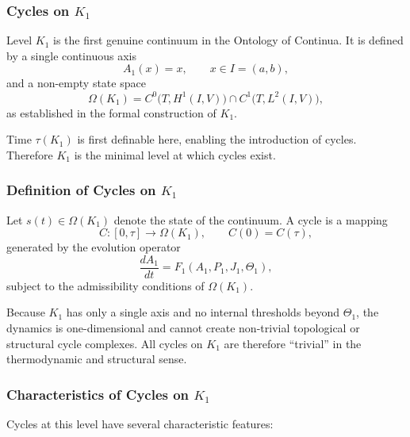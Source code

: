 
\subsubsection{Cycles on \texorpdfstring{$K_1$}{K_1}}
\label{sec:cycles-k1}

Level $K_1$ is the first genuine continuum in the Ontology of
Continua.  
It is defined by a single continuous axis
\[
  A_1(x)=x, \qquad x\in I=(a,b),
\]
and a non-empty state space
\[
  \Omega(K_1)
  = C^0\!\bigl(T, H^1(I,V)\bigr)
    \cap C^1\!\bigl(T, L^2(I,V)\bigr),
\]
as established in the formal construction of $K_1$.

Time $\tau(K_1)$ is first definable here, enabling the introduction of
cycles.  
Therefore $K_1$ is the minimal level at which cycles exist.

\subsubsection{Definition of Cycles on \texorpdfstring{$K_1$}{K_1}}

Let $s(t)\in\Omega(K_1)$ denote the state of the continuum.  
A cycle is a mapping
\[
  C:[0,\tau]\to\Omega(K_1), \qquad
  C(0)=C(\tau),
\]
generated by the evolution operator
\[
  \frac{dA_1}{dt} = F_1(A_1,P_1,J_1,\Theta_1),
\]
subject to the admissibility conditions of $\Omega(K_1)$.

Because $K_1$ has only a single axis and no internal thresholds beyond
$\Theta_1$, the dynamics is one-dimensional and cannot create
non-trivial topological or structural cycle complexes.
All cycles on $K_1$ are therefore ``trivial'' in the thermodynamic and
structural sense.

\subsubsection{Characteristics of Cycles on \texorpdfstring{$K_1$}{K_1}}

Cycles at this level have several characteristic features:

